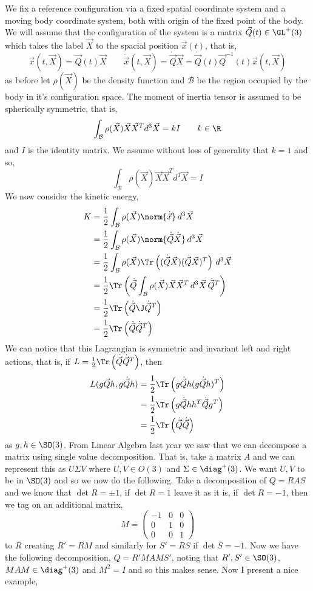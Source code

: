 We fix a reference configuration via a fixed spatial coordinate system and a moving body coordinate system, both with origin of the fixed point of the body. We will assume that the configuration of the system is a matrix $\vec Q(t) \in \GL^+(3)$ which takes the label $\vec X$ to the spacial position $\vec x(t)$, that is,
$$ \vec x(t, \vec X) = \vec Q(t)\vec X \qquad \dot{\vec x}(t, \vec X) = \dot{\vec Q}\vec X = \dot{\vec Q}(t)\vec Q^{-1}(t)\vec x(t, \vec X) $$
as before let $\rho(\vec X)$ be the density function and $\mathcal{B}$ be the region occupied by the body in it's configuration space. The moment of inertia tensor is assumed to be spherically symmetric, that is,
$$ \int_{\mathcal{B}} \rho(\vec X)\vec X\vec X^T d^3\vec X = kI \qquad k \in \R $$
and $I$ is the identity matrix. We assume without loss of generality that $k = 1$ and so,
$$ \int_{\mathcal{B}} \rho(\vec X)\vec X\vec X^T d^3\vec X = I $$
We now consider the kinetic energy,
\begin{align*}
  K &= \frac{1}{2}\int_{\mathcal{B}} \rho(\vec X) \norm{\dot{\vec x}}\, d^3 \vec X \\
  &= \frac{1}{2}\int_{\mathcal{B}} \rho(\vec X) \norm{\dot{\vec Q}\dot{\vec X}}\, d^3 \vec X \\
  &= \frac{1}{2}\int_{\mathcal{B}} \rho(\vec X) \Tr\left( (\dot{\vec Q}\vec X)(\dot{\vec Q}\vec X)^T \right)\, d^3 \vec X \\
  &= \frac{1}{2}\Tr\left(\dot{\vec Q}\int_{\mathcal{B}} \rho(\vec X) \vec X\vec X^T \, d^3 \vec X\, \dot{\vec Q}^T \right)\\
  &= \frac{1}{2}\Tr\left( \dot{\vec Q}\J\dot{\vec Q}^T \right) \\
  &= \frac{1}{2}\Tr\left( \dot{\vec Q}\dot{\vec Q}^T \right)
\end{align*}
We can notice that this Lagrangian is symmetric and invariant left and right actions, that is, if $L = \frac{1}{2}\Tr\left(\dot{\vec Q}\dot{\vec Q}^T\right)$, then \begin{align*}
  L(g\vec{Q}h, g\dot{\vec Q}h) &= \frac{1}{2}\Tr\left( g\dot{\vec Q}h(g\dot{\vec Q}h)^T \right) \\
  &= \frac{1}{2}\Tr\left( g\dot{\vec Q}hh^T\dot{\vec Q}g^T \right) \\
  &= \frac{1}{2}\Tr\left( \dot{\vec Q}\dot{\vec Q} \right)
\end{align*}
as $g, h \in \SO(3)$.
From Linear Algebra last year we saw that we can decompose a matrix using single value decomposition. That is, take a matrix $A$ and we can represent this as $U\Sigma V$ where $U, V \in O(3)$ and $\Sigma \in \diag^+(3)$. We want $U,V$ to be in $\SO(3)$ and so we now do the following. Take a decomposition of $Q = RAS$ and we know that $\det R = \pm 1$, if $\det R = 1$ leave it as it is, if $\det R = -1$, then we tag on an additional matrix,
$$ M = \begin{pmatrix}
  -1 & 0 & 0 \\ 0 & 1 & 0 \\ 0 & 0 & 1
\end{pmatrix} $$
to $R$ creating $R' = RM$ and similarly for $S' = RS$ if $\det S = -1$. Now we have the following decomposition, $Q = R'MAMS'$, noting that $R', S' \in \SO(3)$, $MAM \in \diag^+(3)$ and $M^2 = I$ and so this makes sense. Now I present a nice example,